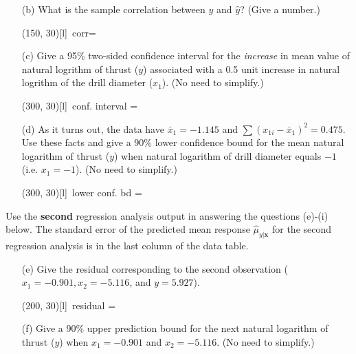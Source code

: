 \documentclass[11pt]{article}
\begin{document}
{\begin{enumerate}
\vskip 4cm

\item[(b)] What is the sample correlation between $y$ and $\hat y$?
 (Give a number.)


\hfill \hfill\framebox(150, 30)[l]{\, corr= }

\vskip 3cm

\newpage
\item[(c)] Give a 95\% two-sided confidence interval for the
\emph{increase} in mean value of natural logrithm of thrust ($y$) associated with a 0.5 unit
increase in natural logrithm of the drill diameter ($x_1$). (No need to simplify.)




 \hfill\framebox(300, 30)[l]{\, conf. interval = }

 \vskip 8cm



\item[(d)] As it turns out, the data have $\bar x_1= -1.145$
 and $\sum (x_{1i} - \bar x_1)^2 = 0.475$. Use these facts
and give a 90\% lower confidence bound for the mean natural logarithm of thrust ($y$) when
natural logarithm of drill diameter  equals $-1$ (i.e. $x_1 = -1$). (No need to simplify.)




 \hfill \framebox(300, 30)[l]{\, lower conf. bd = }


\end{enumerate}
\newpage
\noindent Use the {\bf second} regression analysis
output in answering the questions (e)-(i) below. The standard error of the predicted mean response $\hat{\mu}_{y|\bm x}$ for the second regression analysis is in the last column of the data table.\\

\begin{enumerate}
\item[(e)] Give the residual corresponding to the second
observation ($x_1= -0.901,x_2 = -5.116$, and $y = 5.927$).



 \hfill \framebox(200, 30)[l]{\, residual = }
\vskip 4cm
\item[(f)] Give a 90\% upper prediction bound for the next natural logarithm of thrust ($y$) when $x_1 = -0.901$ and $x_2 =-5.116$. (No need to simplify.)




\end{enumerate}}
\end{document}
